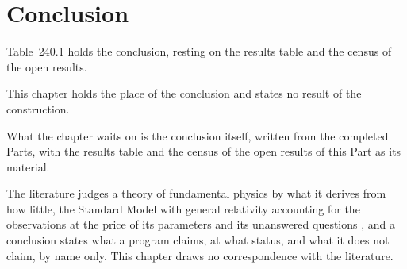 \par\medskip{}\label{narr:close:14-7}\par
\section{Conclusion}\label{mod:XIV-C-conclusion}
\label{narr:open:14-C}Table~240.1 holds the conclusion, resting on the results table and the census of the open results.
\begin{chtable}\label{box:XIV-C-conclusion:1}
This chapter holds the place of the conclusion and states no result of the construction.
\end{chtable}
What the chapter waits on is the conclusion itself, written from the completed Parts, with the results table and the census of the open results of this Part as its material.
\begin{chbridge}
The literature judges a theory of fundamental physics by what it derives from how little, the Standard Model with general relativity accounting for the observations at the price of its parameters and its unanswered questions \cite{Navas2024,Weinberg1995}, and a conclusion states what a program claims, at what status, and what it does not claim, by name only. This chapter draws no correspondence with the literature.
\end{chbridge}
